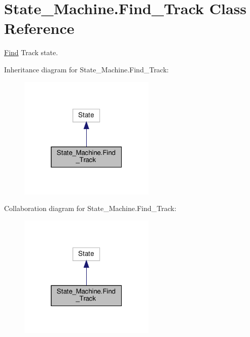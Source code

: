 \hypertarget{classState__Machine_1_1Find__Track}{}\section{State\+\_\+\+Machine.\+Find\+\_\+\+Track Class Reference}
\label{classState__Machine_1_1Find__Track}


\hyperlink{classState__Machine_1_1Find}{Find} Track state.  




Inheritance diagram for State\+\_\+\+Machine.\+Find\+\_\+\+Track\+:
\nopagebreak
\begin{figure}[H]
\begin{center}
\leavevmode
\includegraphics[width=184pt]{classState__Machine_1_1Find__Track__inherit__graph}
\end{center}
\end{figure}


Collaboration diagram for State\+\_\+\+Machine.\+Find\+\_\+\+Track\+:
\nopagebreak
\begin{figure}[H]
\begin{center}
\leavevmode
\includegraphics[width=184pt]{classState__Machine_1_1Find__Track__coll__graph}
\end{center}
\end{figure}
